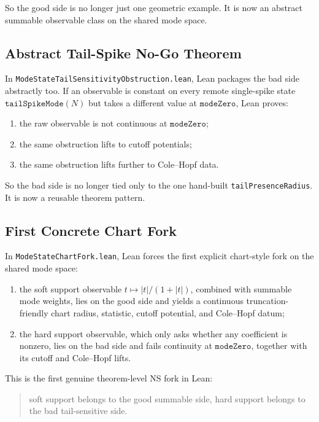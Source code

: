 \documentclass[11pt]{article}
\begin{document}
So the good side is no longer just one geometric example.  It is now an
abstract summable observable class on the shared mode space.

\subsection{Abstract Tail-Spike No-Go Theorem}

In \texttt{ModeStateTailSensitivityObstruction.lean}, Lean packages the bad
side abstractly too.  If an observable is constant on every remote
single-spike state \(\texttt{tailSpikeMode}(N)\) but takes a different value at
\(\texttt{modeZero}\), Lean proves:
\begin{enumerate}[leftmargin=1.5em]
  \item the raw observable is not continuous at \(\texttt{modeZero}\);
  \item the same obstruction lifts to cutoff potentials;
  \item the same obstruction lifts further to Cole--Hopf data.
\end{enumerate}

So the bad side is no longer tied only to the one hand-built
\texttt{tailPresenceRadius}.  It is now a reusable theorem pattern.

\subsection{First Concrete Chart Fork}

In \texttt{ModeStateChartFork.lean}, Lean forces the first explicit chart-style
fork on the shared mode space:
\begin{enumerate}[leftmargin=1.5em]
  \item the soft support observable
  \(t \mapsto |t|/(1+|t|)\), combined with summable mode weights, lies on the
  good side and yields a continuous truncation-friendly chart radius, statistic,
  cutoff potential, and Cole--Hopf datum;
  \item the hard support observable, which only asks whether any coefficient is
  nonzero, lies on the bad side and fails continuity at \(\texttt{modeZero}\),
  together with its cutoff and Cole--Hopf lifts.
\end{enumerate}

This is the first genuine theorem-level NS fork in Lean:
\begin{quote}
soft support belongs to the good summable side, hard support belongs to the
bad tail-sensitive side.
\end{quote}
\end{document}
